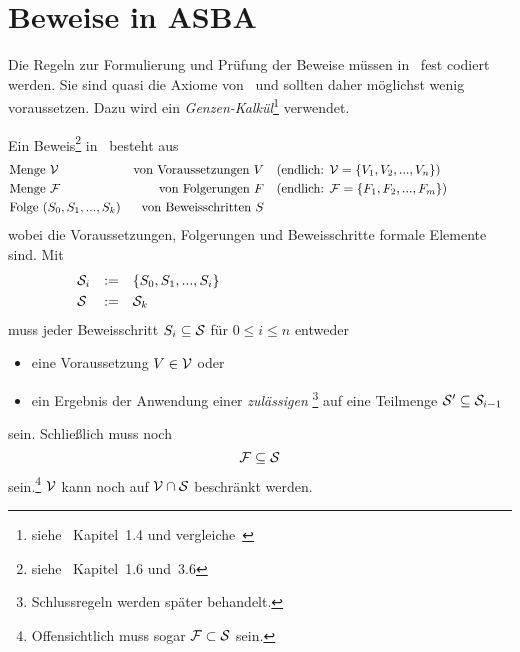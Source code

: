 \section{Beweise in ASBA}%
\label{sec:BeweiseASBA}

Die Regeln zur Formulierung und Prüfung der Beweise müssen in \ASBA\ fest codiert werden.
Sie sind quasi die Axiome von \ASBA\ und sollten daher möglichst wenig voraussetzen.
Dazu wird ein \emph{Genzen-Kalkül}\footnote{%
	siehe~\cite{bib:Rautenberg} Kapitel~1.4 und vergleiche~\cite{bib:Schlussregel,bib:NatuerlichesSchliessen}%
} verwendet.

Ein Beweis\footnote{%
	siehe~\cite{bib:Rautenberg} Kapitel~1.6 und~3.6%
} in \ASBA\ besteht aus
\begin{align}
	& \text{Menge } \mathcal{V}
	& \text{von Voraussetzungen } V
	& \quad (\text{endlich: } \mathcal{V} = \{V_1, V_2, ..., V_n\})
	\label{def:Voraussetzungen}
	\\
	& \text{Menge } \mathcal{F}
	& \text{von Folgerungen } F
	& \quad (\text{endlich: } \mathcal{F} = \{F_1, F_2, ..., F_m\})
	\label{def:Folgerungen}
	\\
	& \text{Folge } (S_0, S_1, ..., S_k)
	& \text{von Beweisschritten } S
	\label{def:Beweisfolge}
	&&&&&&&&&&
\end{align}
wobei die Voraussetzungen, Folgerungen und Beweisschritte formale Elemente sind.
Mit
\begin{align}
	& \mathcal{S}_i & \operatorname{:\!\operatorname{=}} \quad & \{S_0, S_1, ..., S_i\}
	\label{def:Beweisschrittebis}
	\\
	& \mathcal{S}   & \operatorname{:\!\operatorname{=}} \quad & \mathcal{S}_k
	\label{def:Beweisschritte}
	&&&&&&&&&&&&&&&&&&&&&&&&&&&&&&
\end{align}
muss jeder Beweisschritt $S_i \subseteq \mathcal{S} $ für $0 \le i \le n$ entweder

\begin{itemize}
	\item[] eine Voraussetzung $V \in \mathcal{V}$ oder
	\item[] ein Ergebnis der Anwendung einer \emph{zulässigen }\footnote{%
		Schlussregeln werden später behandelt.%
	} auf eine Teilmenge $\mathcal{S}' \subseteq \mathcal{S}_{i-1}$
\end{itemize}
sein.
Schließlich muss noch
\[
	\mathcal{F} \subseteq \mathcal{S}
\]
sein.\footnote{Offensichtlich muss sogar $\mathcal{F} \subset \mathcal{S}$ sein.}
$\mathcal{V}$ kann noch auf $\mathcal{V} \cap \mathcal{S}$ beschränkt werden.

